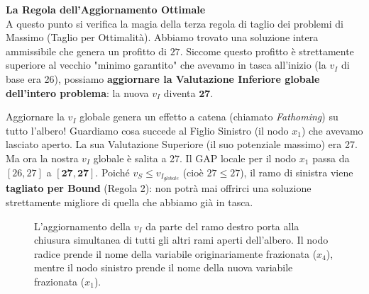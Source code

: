 \documentclass[12pt, a4paper]{article}
\begin{document}
	\vspace{0.4cm}
	\textbf{La Regola dell'Aggiornamento Ottimale}\\
	A questo punto si verifica la magia della terza regola di taglio dei problemi di Massimo (Taglio per Ottimalità).
	Abbiamo trovato una soluzione intera ammissibile che genera un profitto di $27$. Siccome questo profitto è strettamente superiore al vecchio "minimo garantito" che avevamo in tasca all'inizio (la $v_I$ di base era 26), possiamo \textbf{aggiornare la Valutazione Inferiore globale dell'intero problema}: la nuova $v_I$ diventa $\mathbf{27}$.
	
	Aggiornare la $v_I$ globale genera un effetto a catena (chiamato \textit{Fathoming}) su tutto l'albero!
	Guardiamo cosa succede al Figlio Sinistro (il nodo $x_1$) che avevamo lasciato aperto. La sua Valutazione Superiore (il suo potenziale massimo) era 27. Ma ora la nostra $v_I$ globale è salita a 27.
	Il GAP locale per il nodo $x_1$ passa da $[26, 27]$ a $\mathbf{[27, 27]}$. 
	Poiché $v_S \leq v_{I_{globale}}$ (cioè $27 \leq 27$), il ramo di sinistra viene \textbf{tagliato per Bound} (Regola 2): non potrà mai offrirci una soluzione strettamente migliore di quella che abbiamo già in tasca.
	
	\begin{figure}[H]
		\centering
		\caption{L'aggiornamento della $v_I$ da parte del ramo destro porta alla chiusura simultanea di tutti gli altri rami aperti dell'albero. Il nodo radice prende il nome della variabile originariamente frazionata ($x_4$), mentre il nodo sinistro prende il nome della nuova variabile frazionata ($x_1$).}
	\end{figure}
	
\end{document}
